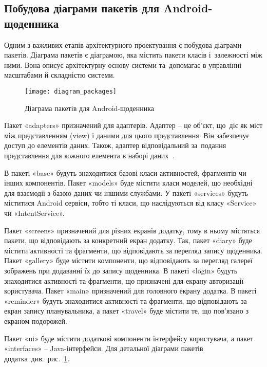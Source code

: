 \documentclass[../main.tex]{subfiles}
\begin{document}
\subsection{Побудова діаграми пакетів для Android-щоденника}
Одним з важливих етапів архітектурного проектування є побудова діаграми пакетів. Діаграма пакетів є діаграмою, яка містить пакети класів і~залежності між ними. Вона описує архітектурну основу системи та~допомагає в управлінні масштабами й складністю системи. 


\begin{figure}[h]
	\centering
	\texttt{[image: diagram\_packages]}
	\caption{Діаграма пакетів для Android-щоденника}
	\label{diagram:packages}
\end{figure}


Пакет «adapters» призначений для адаптерів. Адаптер -- це об'єкт, що~діє як міст між представленням (view) і даними для цього представлення. Він забезпечує доступ до елементів даних. Також, адаптер відповідальний за~подання представлення для кожного елемента в наборі даних~\cite{adapter}. 

В пакеті «base» будуть знаходитися базові класи активностей, фрагментів чи інших компонентів.
Пакет «models» буде містити класи моделей, що необхідні для взаємодії з базою даних чи іншими службами. У пакеті «services» будуть міститися Android сервіси, тобто ті класи, що наслідуються від класу «Service» чи «IntentService».

Пакет «screens» призначений для різних екранів додатку, тому в ньому містяться пакети, що відповідають за конкретний екран додатку. Так, пакет «diary» буде містити активності та фрагменти, що відповідають за перегляд запису щоденника. Пакет «gallery» буде містити компоненти, що відповідають за перегляд галереї зображень при додаванні їх до запису щоденника. В пакеті «login» будуть знаходитися активності та фрагменти, що призначені для екрану авторизації користувача. Пакет «main» призначений для головного екрану додатка. В пакеті «reminder» будуть знаходитися активності та фрагменти, що відповідають за екран запису планувальника, а пакет «travel» буде містити те, що пов'язано з екраном подорожей.

Пакет «ui» буде містити додаткові компоненти інтерфейсу користувача, а пакет «interfaces» -- Java-інтерфейси. Для детальної діаграми пакетів додатка~див.~рис.~\ref{diagram:packages}.

\end{document}
